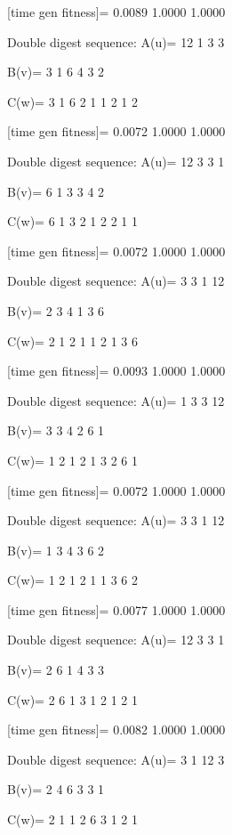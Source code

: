 [time gen fitness]=
    0.0089    1.0000    1.0000

Double digest sequence:
A(u)=
    12     1     3     3

B(v)=
     3     1     6     4     3     2

C(w)=
     3     1     6     2     1     1     2     1     2

[time gen fitness]=
    0.0072    1.0000    1.0000

Double digest sequence:
A(u)=
    12     3     3     1

B(v)=
     6     1     3     3     4     2

C(w)=
     6     1     3     2     1     2     2     1     1

[time gen fitness]=
    0.0072    1.0000    1.0000

Double digest sequence:
A(u)=
     3     3     1    12

B(v)=
     2     3     4     1     3     6

C(w)=
     2     1     2     1     1     2     1     3     6

[time gen fitness]=
    0.0093    1.0000    1.0000

Double digest sequence:
A(u)=
     1     3     3    12

B(v)=
     3     3     4     2     6     1

C(w)=
     1     2     1     2     1     3     2     6     1

[time gen fitness]=
    0.0072    1.0000    1.0000

Double digest sequence:
A(u)=
     3     3     1    12

B(v)=
     1     3     4     3     6     2

C(w)=
     1     2     1     2     1     1     3     6     2

[time gen fitness]=
    0.0077    1.0000    1.0000

Double digest sequence:
A(u)=
    12     3     3     1

B(v)=
     2     6     1     4     3     3

C(w)=
     2     6     1     3     1     2     1     2     1

[time gen fitness]=
    0.0082    1.0000    1.0000

Double digest sequence:
A(u)=
     3     1    12     3

B(v)=
     2     4     6     3     3     1

C(w)=
     2     1     1     2     6     3     1     2     1

